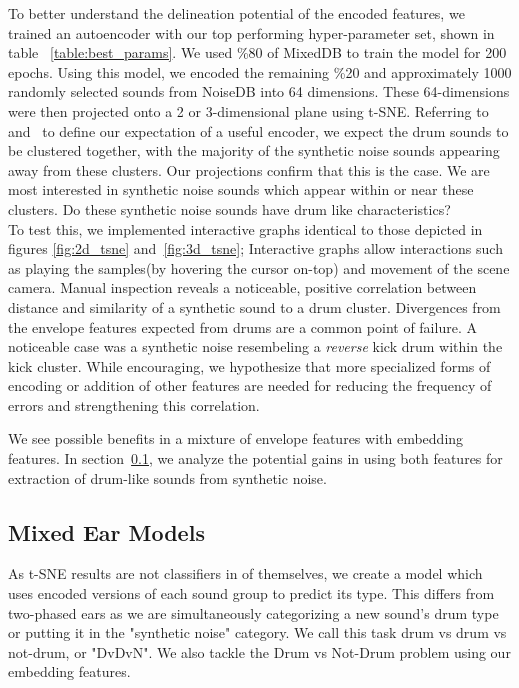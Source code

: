 \documentclass[\main/thesis.tex]{subfiles}
\begin{document}
To better understand the delineation potential of the encoded features,  we trained an autoencoder with our top performing hyper-parameter set, shown in table ~\ref{table:best_params}. We used \%80 of MixedDB to train the model for 200 epochs. Using this model, we encoded the remaining \%20 and approximately 1000 randomly selected sounds from NoiseDB into 64 dimensions. These 64-dimensions were then projected onto a 2 or 3-dimensional plane using t-SNE. Referring to~ and~ to define our expectation of a useful encoder, we expect the drum sounds to be clustered together, with the majority of the synthetic noise sounds appearing away from these clusters. Our projections confirm that this is the case. We are most interested in synthetic noise sounds which appear within or near these clusters. Do these synthetic noise sounds have drum like characteristics?\\ 


To test this, we implemented interactive graphs identical to those depicted in figures \ref{fig:2d_tsne} and~\ref{fig:3d_tsne}; Interactive graphs allow interactions such as playing the samples(by hovering the cursor on-top) and movement of the scene camera.  Manual inspection reveals a noticeable, positive correlation between distance and similarity of a synthetic sound to a drum cluster. Divergences from the envelope features expected from drums are a common point of failure. A noticeable case was a synthetic noise resembeling a \emph{reverse} kick drum within the kick cluster. While encouraging, we hypothesize that more specialized forms of encoding or addition of other features are needed for reducing the frequency of errors and strengthening this correlation.

We see possible benefits in a mixture of envelope features with embedding features. In section~\ref{chap3:mixed_ear_models}, we analyze the potential gains in using both features for extraction of drum-like sounds from synthetic noise. 

\subsection{Mixed Ear Models}
\label{chap3:mixed_ear_models}
As t-SNE results are not classifiers in of themselves, we create a model which uses encoded versions of each sound group to predict its type. This differs from two-phased ears as we are simultaneously categorizing a new sound's drum type or putting it in the "synthetic noise" category. We call this task drum vs drum vs not-drum, or "DvDvN". We also tackle the Drum vs Not-Drum problem using our embedding features.
\end{document}

